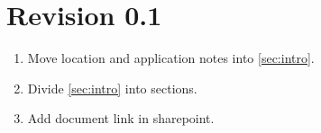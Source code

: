 \section{Revision 0.1}\label{sec:chg log 0.1}
\begin{enumerate}
\item Move \mhdlc{} location and application notes into \autoref{sec:intro}.
\item Divide \autoref{sec:intro} into sections.
\item Add document link in sharepoint. 
\end{enumerate}


